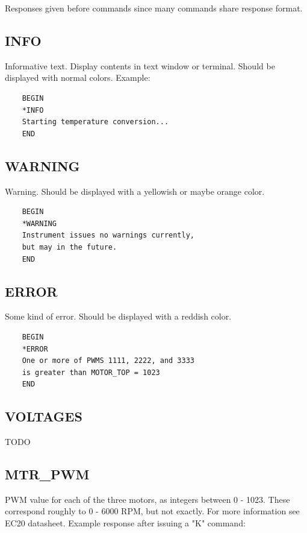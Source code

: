 \documentclass{article}
\begin{document}
Responses given before commands since many commands share response format.

\subsection{INFO}

Informative text.
Display contents in text window or terminal.
Should be displayed with normal colors.
Example:

\begin{lstlisting}
    BEGIN
    *INFO
    Starting temperature conversion...
    END
\end{lstlisting}


\subsection{WARNING}

Warning.
Should be displayed with a yellowish or maybe orange color.

\begin{lstlisting}
    BEGIN
    *WARNING
    Instrument issues no warnings currently,
    but may in the future.
    END
\end{lstlisting}


\subsection{ERROR}

Some kind of error.
Should be displayed with a reddish color.

\begin{lstlisting}
    BEGIN
    *ERROR
    One or more of PWMS 1111, 2222, and 3333
    is greater than MOTOR_TOP = 1023
    END
\end{lstlisting}


\subsection{VOLTAGES}

TODO

\subsection{MTR\_PWM}

PWM value for each of the three motors, as integers between 0 - 1023.
These correspond roughly to 0 - 6000 RPM, but not exactly.
For more information see EC20 datasheet.
Example response after issuing a "K" command:
\end{document}
